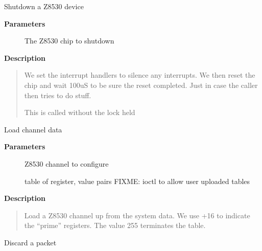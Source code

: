 \documentclass[a4paper,8pt,english]{sphinxmanual}
\begin{document}
\begin{fulllineitems}
\label{networking/z8530book:c.z8530_shutdown}
Shutdown a Z8530 device

\end{fulllineitems}


\textbf{Parameters}
\begin{description}
\item[{}] \leavevmode
The Z8530 chip to shutdown

\end{description}

\textbf{Description}
\begin{quote}

We set the interrupt handlers to silence any interrupts. We then
reset the chip and wait 100uS to be sure the reset completed. Just
in case the caller then tries to do stuff.

This is called without the lock held
\end{quote}

\begin{fulllineitems}
\label{networking/z8530book:c.z8530_channel_load}
Load channel data

\end{fulllineitems}


\textbf{Parameters}
\begin{description}
\item[{}] \leavevmode
Z8530 channel to configure

\item[{}] \leavevmode
table of register, value pairs
FIXME: ioctl to allow user uploaded tables

\end{description}

\textbf{Description}
\begin{quote}

Load a Z8530 channel up from the system data. We use +16 to
indicate the ``prime'' registers. The value 255 terminates the
table.
\end{quote}

\begin{fulllineitems}
\label{networking/z8530book:c.z8530_null_rx}
Discard a packet

\end{fulllineitems}
\end{document}
